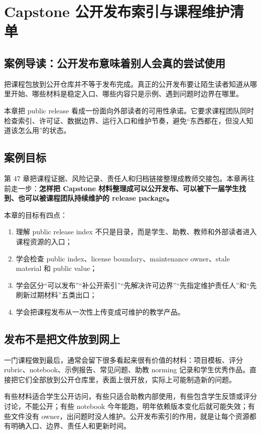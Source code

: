 \chapter{Capstone 公开发布索引与课程维护清单}

\section{案例导读：公开发布意味着别人会真的尝试使用}

把课程包放到公开仓库并不等于发布完成。真正的公开发布要让陌生读者知道从哪里开始、哪些材料是稳定入口、哪些内容只是示例、遇到问题时边界在哪里。

本章把 public release 看成一份面向外部读者的可用性承诺。它要求课程团队同时检查索引、许可证、数据边界、运行入口和维护节奏，避免“东西都在，但没人知道该怎么用”的状态。

\section{案例目标}

第 47 章把课程证据、风险记录、责任人和归档链接整理成教师交接包。本章再往前走一步：\textbf{怎样把 Capstone 材料整理成可以公开发布、可以被下一届学生找到、也可以被课程团队持续维护的 release package。}

本章的目标有四点：

\begin{enumerate}
    \item 理解 public release index 不只是目录，而是学生、助教、教师和外部读者进入课程资源的入口；
    \item 学会检查 public index、license boundary、maintenance owner、stale material 和 public value；
    \item 学会区分“可以发布”“补公开索引”“先解决许可边界”“先指定维护责任人”和“先刷新过期材料”五类出口；
    \item 学会把课程发布从一次性上传变成可维护的教学产品。
\end{enumerate}

\section{发布不是把文件放到网上}

一门课程做到最后，通常会留下很多看起来很有价值的材料：项目模板、评分 rubric、notebook、示例报告、常见问题、助教 norming 记录和学生优秀作品。直接把它们全部放到公开仓库里，表面上很开放，实际上可能制造新的问题。

有些材料适合学生公开访问，有些只适合助教内部使用，有些包含学生反馈或评分讨论，不能公开；有些 notebook 今年能跑，明年依赖版本变化后就可能失效；有些文件没有 owner，出问题时没人维护。公开发布索引的作用，就是让每个资源都有明确入口、边界、责任人和更新时间。

